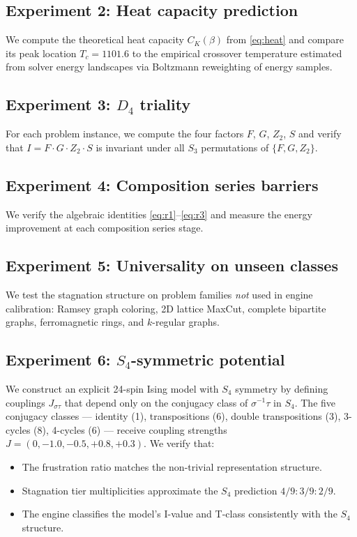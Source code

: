 \documentclass[11pt]{amsart}
\theoremstyle{definition}
\begin{document}
\subsection{Experiment 2: Heat capacity prediction}

We compute the theoretical heat capacity $C_K(\beta)$ from \eqref{eq:heat} and compare its peak location $T_c = 1101.6$ to the empirical crossover temperature estimated from solver energy landscapes via Boltzmann reweighting of energy samples.

\subsection{Experiment 3: $D_4$ triality}

For each problem instance, we compute the four factors $F$, $G$, $Z_2$, $S$ and verify that $I = F \cdot G \cdot Z_2 \cdot S$ is invariant under all $S_3$ permutations of $\{F, G, Z_2\}$.

\subsection{Experiment 4: Composition series barriers}

We verify the algebraic identities \eqref{eq:r1}--\eqref{eq:r3} and measure the energy improvement at each composition series stage.

\subsection{Experiment 5: Universality on unseen classes}

We test the stagnation structure on problem families \emph{not} used in engine calibration: Ramsey graph coloring, 2D lattice MaxCut, complete bipartite graphs, ferromagnetic rings, and $k$-regular graphs.

\subsection{Experiment 6: $S_4$-symmetric potential}

We construct an explicit 24-spin Ising model with $S_4$ symmetry by defining couplings $J_{\sigma\tau}$ that depend only on the conjugacy class of $\sigma^{-1}\tau$ in $S_4$. The five conjugacy classes --- identity (1), transpositions (6), double transpositions (3), 3-cycles (8), 4-cycles (6) --- receive coupling strengths $J = (0, -1.0, -0.5, +0.8, +0.3)$. We verify that:
\begin{itemize}
\item The frustration ratio matches the non-trivial representation structure.
\item Stagnation tier multiplicities approximate the $S_4$ prediction $4/9 : 3/9 : 2/9$.
\item The engine classifies the model's I-value and T-class consistently with the $S_4$ structure.
\end{itemize}
\end{document}
